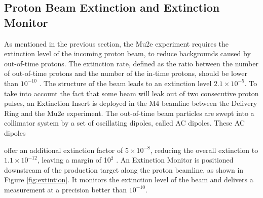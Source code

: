 \subsection{Proton Beam Extinction and Extinction Monitor}
As mentioned in the previous section, the Mu2e experiment 
requires the extinction level of the incoming proton beam, to reduce backgrounds caused by out-of-time protons. 
The extinction rate, defined as the ratio between the 
number of out-of-time protons and the number of the in-time protons, should be lower than $10^{-10}$ \cite{bartoszek2015mu2e}. The structure of the beam 
leads to an extinction level $2.1 \times 10^{-5}$. To take into account the fact that some beam will 
leak out of two consecutive proton pulses, an Extinction 
Insert is deployed in the M4 beamline between the Delivery Ring and the Mu2e experiment.
{\red The out-of-time 
beam particles are swept into a collimator system by a 
set of oscillating dipoles, called AC dipoles. These AC dipoles}

offer an additional 
extinction factor of $5\times 10^{-8}$, reducing the 
overall extinction to $1.1 \times 10^{-12}$, leaving a margin of 10$^2$ \cite{accelerator}. An 
Extinction Monitor is positioned downstream of the 
production target along the proton beamline, as shown in Figure \ref{fig:extintion}. It monitors the 
extinction level of the  beam  {\red and delivers a measurement at a precision better than $10^{-10}$.}


